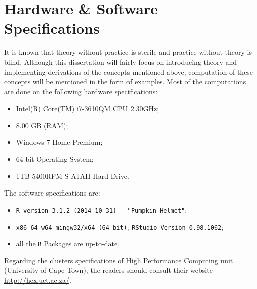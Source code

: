 \section{Hardware \& Software Specifications}
It is known that theory without practice is sterile and practice without theory is blind. Although this dissertation will fairly focus on introducing theory and implementing derivations of the concepts mentioned above, computation of these concepts will be mentioned in the form of examples. Most of the computations are done on the following hardware specifications:
\begin{itemize}
\item \textrm{Intel(R) Core(TM) i7-3610QM CPU 2.30GHz};
\item \textrm{8.00 GB (RAM)};
\item \textrm{Windows 7 Home Premium};
\item \textrm{64-bit Operating System};
\item \textrm{1TB 5400RPM S-ATAII Hard Drive}.
\end{itemize}
The software specifications are:
\begin{itemize}
\item \texttt{R version 3.1.2 (2014-10-31) -- "Pumpkin Helmet"};
\item \texttt{x86\_64-w64-mingw32/x64 (64-bit)};
\texttt{RStudio Version 0.98.1062};
\item all the \texttt{R} Packages are up-to-date.
\end{itemize}
Regarding the clusters specifications of High Performance Computing unit (University of Cape Town), the readers should consult their website \href{http://hex.uct.ac.za/}{http://hex.uct.ac.za/}.
